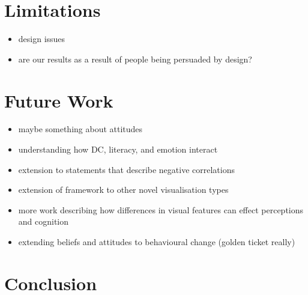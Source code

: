 \documentclass[manuscript,screen,review]{acmart}
\providecommand{\tightlist}{%
  \setlength{\itemsep}{0pt}\setlength{\parskip}{0pt}}\usepackage{longtable,booktabs,array}
\begin{document}
\section{Limitations}\label{sec-limitations}

\begin{itemize}
\tightlist
\item
  design issues
\item
  are our results as a result of people being persuaded by design?
\end{itemize}

\section{Future Work}\label{sec-future-work}

\begin{itemize}
\tightlist
\item
  maybe something about attitudes
\item
  understanding how DC, literacy, and emotion interact
\item
  extension to statements that describe negative correlations
\item
  extension of framework to other novel visualisation types
\item
  more work describing how differences in visual features can effect
  perceptions and cognition
\item
  extending beliefs and attitudes to behavioural change (golden ticket
  really)
\end{itemize}

\section{Conclusion}\label{sec-conclusion}




\end{document}
